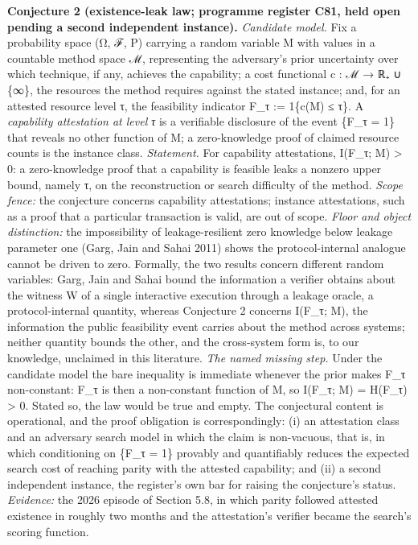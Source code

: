 \documentclass[
]{llncs}
\begin{document}
\textbf{Conjecture 2 (existence-leak law; programme register C81, held
open pending a second independent instance).} \emph{Candidate model.}
Fix a probability space (Ω, ℱ, P) carrying a random variable M with
values in a countable method space ℳ, representing the adversary's prior
uncertainty over which technique, if any, achieves the capability; a
cost functional c : ℳ → ℝ₊ ∪ \{∞\}, the resources the method requires
against the stated instance; and, for an attested resource level τ, the
feasibility indicator F\_τ := 1\{c(M) ≤ τ\}. A \emph{capability
attestation at level τ} is a verifiable disclosure of the event \{F\_τ =
1\} that reveals no other function of M; a zero-knowledge proof of
claimed resource counts is the instance class. \emph{Statement.} For
capability attestations, I(F\_τ; M) \textgreater{} 0: a zero-knowledge
proof that a capability is feasible leaks a nonzero upper bound, namely
τ, on the reconstruction or search difficulty of the method. \emph{Scope
fence:} the conjecture concerns capability attestations; instance
attestations, such as a proof that a particular transaction is valid,
are out of scope. \emph{Floor and object distinction:} the impossibility
of leakage-resilient zero knowledge below leakage parameter one (Garg,
Jain and Sahai 2011) shows the protocol-internal analogue cannot be
driven to zero. Formally, the two results concern different random
variables: Garg, Jain and Sahai bound the information a verifier obtains
about the witness W of a single interactive execution through a leakage
oracle, a protocol-internal quantity, whereas Conjecture 2 concerns
I(F\_τ; M), the information the public feasibility event carries about
the method across systems; neither quantity bounds the other, and the
cross-system form is, to our knowledge, unclaimed in this literature.
\emph{The named missing step.} Under the candidate model the bare
inequality is immediate whenever the prior makes F\_τ non-constant: F\_τ
is then a non-constant function of M, so I(F\_τ; M) = H(F\_τ)
\textgreater{} 0. Stated so, the law would be true and empty. The
conjectural content is operational, and the proof obligation is
correspondingly: (i) an attestation class and an adversary search model
in which the claim is non-vacuous, that is, in which conditioning on
\{F\_τ = 1\} provably and quantifiably reduces the expected search cost
of reaching parity with the attested capability; and (ii) a second
independent instance, the register's own bar for raising the
conjecture's status. \emph{Evidence:} the 2026 episode of Section 5.8,
in which parity followed attested existence in roughly two months and
the attestation's verifier became the search's scoring function.
\end{document}
